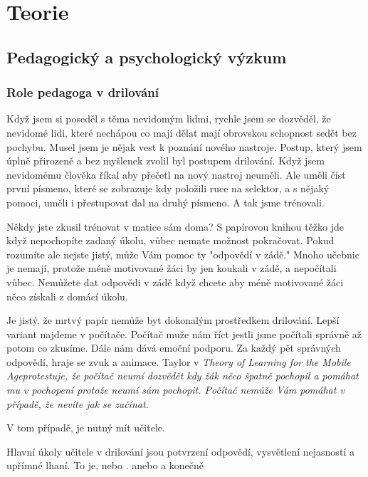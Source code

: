 \chapter{Teorie}

\section{Pedagogický a psychologický výzkum}

\subsection{Role pedagoga v drilování}

Když jsem si poseděl s těma nevidomým lidmi, rychle jsem se dozvěděl, že nevidomé lidi, které nechápou co mají dělat mají obrovskou schopnost sedět bez pochybu.  Musel jsem je nějak vest k poznání nového nastroje.  Postup, který jsem úplně přirozeně a bez myšlenek zvolil byl postupem drilování.  Když jsem nevidomému člověka říkal aby přečetl na nový nastroj neuměli.  Ale uměli číst první písmeno, které se zobrazuje kdy položili ruce na selektor, a s nějaký pomoci, uměli i přestupovat dal na druhý písmeno.  A tak jsme trénovali.

Někdy jste zkusil trénovat v matice sám doma?  S papírovou knihou těžko jde když nepochopíte zadaný úkolu, vůbec nemate možnost pokračovat.  Pokud rozumíte ale nejste jistý, může Vám pomoc ty "odpovědí v zádě."  Mnoho učebnic je nemají, protože méně motivované žáci by jen koukali v zádě, a nepočítali vůbec.  Nemůžete dat odpovědi v zádě když chcete aby méně motivované žáci něco získali z domácí úkolu.

Je jistý, že mrtvý papír nemůže byt dokonalým prostředkem drilování.  Lepší variant najdeme v počítače.  Počítač muže nám říct jestli jsme počítali správně až potom co zkusíme.  Dále nám dává emoční podporu.  Za každý pět správných odpovědí, hraje se zvuk a animace. Taylor v \em Theory of Learning for the Mobile Age\em protestuje, že počítač neumí dozvědět kdy žák něco špatně pochopil a pomáhat mu v pochopení protože neumí sám pochopit\citep{taylor2010theory}. Počítač nemůže Vám pomáhat v případě, že nevíte jak se začínat.

V tom případě, je nutný mít učitele.

Hlavní úkoly učitele v drilování jsou potvrzení odpovědí, vysvětlení nejasností a upřímné lhaní.  To je,  nebo .  anebo  a konečně 

